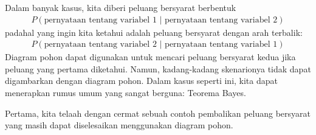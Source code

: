 
Dalam banyak kasus, kita diberi peluang bersyarat berbentuk
\begin{align*}
P(\text{pernyataan tentang variabel 1 } | \text{ pernyataan tentang variabel 2})
\end{align*}
padahal yang ingin kita ketahui adalah peluang bersyarat dengan arah terbalik:
\begin{align*}
P(\text{pernyataan tentang variabel 2 } | \text{ pernyataan tentang variabel 1})
\end{align*}
Diagram pohon dapat digunakan untuk mencari peluang bersyarat kedua jika peluang yang pertama diketahui. Namun, kadang-kadang skenarionya tidak dapat digambarkan dengan diagram pohon. Dalam kasus seperti ini, kita dapat menerapkan rumus umum yang sangat berguna: Teorema Bayes.

Pertama, kita telaah dengan cermat sebuah contoh pembalikan peluang bersyarat yang masih dapat diselesaikan menggunakan diagram pohon.

\D{\newpage}

